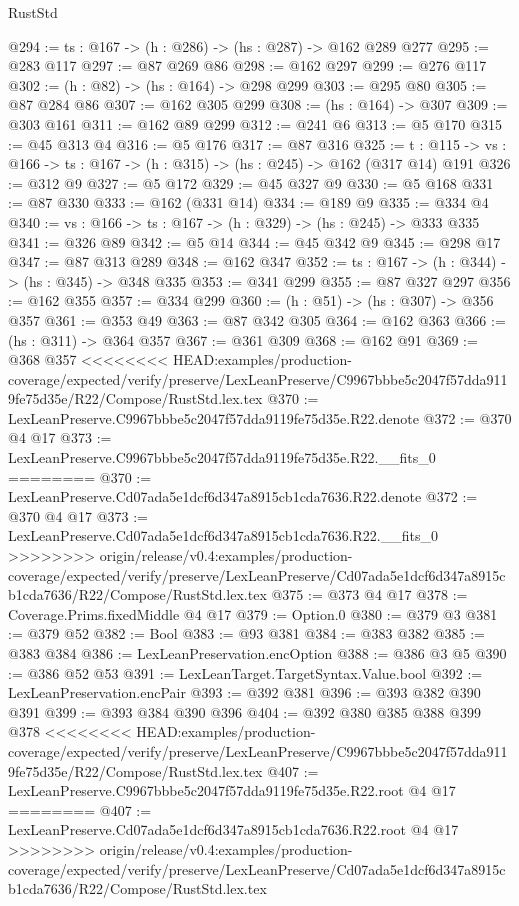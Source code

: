 \begin{lexlean}{RustStd}
\begin{coremodule}
{\begin{coremodule}
@294 := {ts : @167} -> (h : @286) -> (hs : @287) -> @162 @289 @277
@295 := @283 @117
@297 := @87 @269 @86
@298 := @162 @297
@299 := @276 @117
@302 := (h : @82) -> (hs : @164) -> @298 @299
@303 := @295 @80
@305 := @87 @284 @86
@307 := @162 @305 @299
@308 := (hs : @164) -> @307
@309 := @303 @161
@311 := @162 @89 @299
@312 := @241 @6
@313 := @5 @170
@315 := @45 @313 @4
@316 := @5 @176
@317 := @87 @316
@325 := {t : @115} ->
  {vs : @166} -> {ts : @167} -> (h : @315) -> (hs : @245) -> @162 (@317 @14) @191
@326 := @312 @9
@327 := @5 @172
@329 := @45 @327 @9
@330 := @5 @168
@331 := @87 @330
@333 := @162 (@331 @14)
@334 := @189 @9
@335 := @334 @4
@340 := {vs : @166} -> {ts : @167} -> (h : @329) -> (hs : @245) -> @333 @335
@341 := @326 @89
@342 := @5 @14
@344 := @45 @342 @9
@345 := @298 @17
@347 := @87 @313 @289
@348 := @162 @347
@352 := {ts : @167} -> (h : @344) -> (hs : @345) -> @348 @335
@353 := @341 @299
@355 := @87 @327 @297
@356 := @162 @355
@357 := @334 @299
@360 := (h : @51) -> (hs : @307) -> @356 @357
@361 := @353 @49
@363 := @87 @342 @305
@364 := @162 @363
@366 := (hs : @311) -> @364 @357
@367 := @361 @309
@368 := @162 @91
@369 := @368 @357
<<<<<<<< HEAD:examples/production-coverage/expected/verify/preserve/LexLeanPreserve/C9967bbbe5c2047f57dda9119fe75d35e/R22/Compose/RustStd.lex.tex
@370 := LexLeanPreserve.C9967bbbe5c2047f57dda9119fe75d35e.R22.denote
@372 := @370 @4 @17
@373 := LexLeanPreserve.C9967bbbe5c2047f57dda9119fe75d35e.R22.__fits_0
========
@370 := LexLeanPreserve.Cd07ada5e1dcf6d347a8915cb1cda7636.R22.denote
@372 := @370 @4 @17
@373 := LexLeanPreserve.Cd07ada5e1dcf6d347a8915cb1cda7636.R22.__fits_0
>>>>>>>> origin/release/v0.4:examples/production-coverage/expected/verify/preserve/LexLeanPreserve/Cd07ada5e1dcf6d347a8915cb1cda7636/R22/Compose/RustStd.lex.tex
@375 := @373 @4 @17
@378 := Coverage.Prims.fixedMiddle @4 @17
@379 := Option.{0}
@380 := @379 @3
@381 := @379 @52
@382 := Bool
@383 := @93 @381
@384 := @383 @382
@385 := @383 @384
@386 := LexLeanPreservation.encOption
@388 := @386 @3 @5
@390 := @386 @52 @53
@391 := LexLeanTarget.TargetSyntax.Value.bool
@392 := LexLeanPreservation.encPair
@393 := @392 @381
@396 := @393 @382 @390 @391
@399 := @393 @384 @390 @396
@404 := @392 @380 @385 @388 @399 @378
<<<<<<<< HEAD:examples/production-coverage/expected/verify/preserve/LexLeanPreserve/C9967bbbe5c2047f57dda9119fe75d35e/R22/Compose/RustStd.lex.tex
@407 := LexLeanPreserve.C9967bbbe5c2047f57dda9119fe75d35e.R22.root @4 @17
========
@407 := LexLeanPreserve.Cd07ada5e1dcf6d347a8915cb1cda7636.R22.root @4 @17
>>>>>>>> origin/release/v0.4:examples/production-coverage/expected/verify/preserve/LexLeanPreserve/Cd07ada5e1dcf6d347a8915cb1cda7636/R22/Compose/RustStd.lex.tex

\end{coremodule}}
\end{coremodule}
\end{lexlean}
